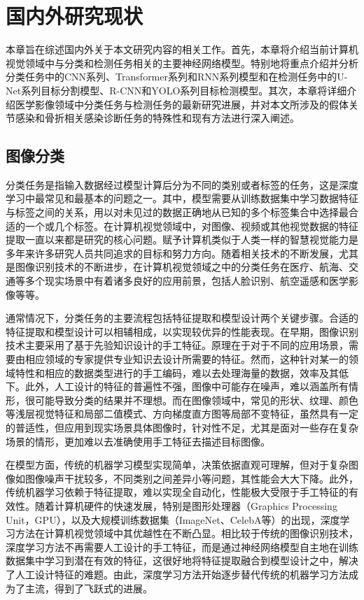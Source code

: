 \chapter{国内外研究现状}\label{chap:related_work}

本章旨在综述国内外关于本文研究内容的相关工作。首先，本章将介绍当前计算机视觉领域中与分类和检测任务相关的主要神经网络模型。特别地将重点介绍并分析分类任务中的CNN系列、Transformer系列和RNN系列模型和在检测任务中的U-Net系列目标分割模型、R-CNN和YOLO系列目标检测模型。其次，本章将详细介绍医学影像领域中分类任务与检测任务的最新研究进展，并对本文所涉及的假体关节感染和骨折相关感染诊断任务的特殊性和现有方法进行深入阐述。

\section{图像分类}

分类任务是指输入数据经过模型计算后分为不同的类别或者标签的任务，这是深度学习中最常见和最基本的问题之一。其中，模型需要从训练数据集中学习数据特征与标签之间的关系，用以对未见过的数据正确地从已知的多个标签集合中选择最合适的一个或几个标签。在计算机视觉领域中，对图像、视频或其他视觉数据的特征提取一直以来都是研究的核心问题。赋予计算机类似于人类一样的智慧视觉能力是多年来许多研究人员共同追求的目标和努力方向。随着相关技术的不断发展，尤其是图像识别技术的不断进步，在计算机视觉领域之中的分类任务在医疗、航海、交通等多个现实场景中有着诸多良好的应用前景，包括人脸识别、航空遥感和医学影像等等。

通常情况下，分类任务的主要流程包括特征提取和模型设计两个关键步骤。合适的特征提取和模型设计可以相辅相成，以实现较优异的性能表现。在早期，图像识别技术\cite{fu1976pattern}主要采用了基于先验知识设计的手工特征。原理在于对于不同的应用场景，需要由相应领域的专家提供专业知识去设计所需要的特征。然而，这种针对某一的领域特性和相应的数据类型进行的手工编码，难以去处理海量的数据，效率及其低下\cite{季长清2022基于卷积神经网络的图像分类算法综述}。此外，人工设计的特征的普遍性不强，图像中可能存在噪声，难以涵盖所有情形，很可能导致分类的结果并不理想。而在图像领域中，常见的形状、纹理、颜色等浅层视觉特征和局部二值模式、方向梯度直方图等局部不变特征，虽然具有一定的普适性，但应用到现实场景具体图像时，针对性不足，尤其是面对一些存在复杂场景的情形，更加难以去准确使用手工特征去描述目标图像\cite{杨真真2018基于卷积神经网络的图像分类算法综述}。

在模型方面，传统的机器学习模型实现简单，决策依据直观可理解，但对于复杂图像如图像噪声干扰较多，不同类别之间差异小等问题，其性能会大大下降。此外，传统机器学习依赖于特征提取，难以实现全自动化，性能极大受限于手工特征的有效性。随着计算机硬件的快速发展，特别是图形处理器（Graphics Processing Unit，GPU），以及大规模训练数据集（ImageNet\cite{deng2009imagenet}、CelebA\cite{liu2018large}等）的出现，深度学习方法在计算机视觉领域中其优越性在不断凸显。相比较于传统的图像识别技术，深度学习方法不再需要人工设计的手工特征，而是通过神经网络模型自主地在训练数据集中学习到潜在有效的特征，这很好地将特征提取融合到模型设计之中，解决了人工设计特征的难题。由此，深度学习方法开始逐步替代传统的机器学习方法成为了主流，得到了飞跃式的进展。

